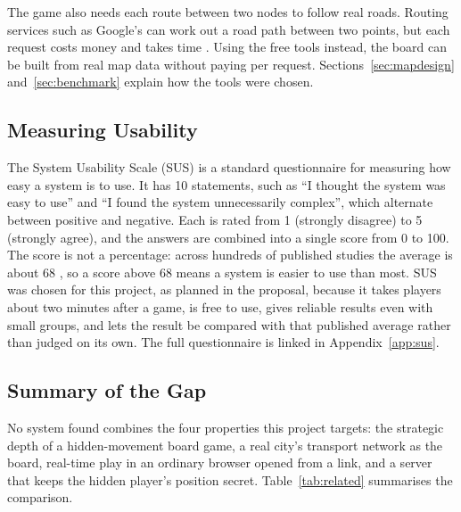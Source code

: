 \documentclass[lettersize,journal]{IEEEtran}
\begin{document}
The game also needs each route between two nodes to follow real roads. Routing services such as Google's can work out a road path between two points, but each request costs money and takes time \cite{googlemaps_pricing}. Using the free tools instead, the board can be built from real map data without paying per request. Sections~\ref{sec:mapdesign} and~\ref{sec:benchmark} explain how the tools were chosen.

\subsection{Measuring Usability}
The System Usability Scale (SUS) \cite{brooke1996sus} is a standard questionnaire for measuring how easy a system is to use. It has 10 statements, such as ``I thought the system was easy to use'' and ``I found the system unnecessarily complex'', which alternate between positive and negative. Each is rated from 1 (strongly disagree) to 5 (strongly agree), and the answers are combined into a single score from 0 to 100. The score is not a percentage: across hundreds of published studies the average is about 68 \cite{sauro2011sus}, so a score above 68 means a system is easier to use than most. SUS was chosen for this project, as planned in the proposal, because it takes players about two minutes after a game, is free to use, gives reliable results even with small groups, and lets the result be compared with that published average rather than judged on its own. The full questionnaire is linked in Appendix~\ref{app:sus}.

\subsection{Summary of the Gap}
No system found combines the four properties this project targets: the strategic depth of a hidden-movement board game, a real city's transport network as the board, real-time play in an ordinary browser opened from a link, and a server that keeps the hidden player's position secret. Table~\ref{tab:related} summarises the comparison.
\end{document}
